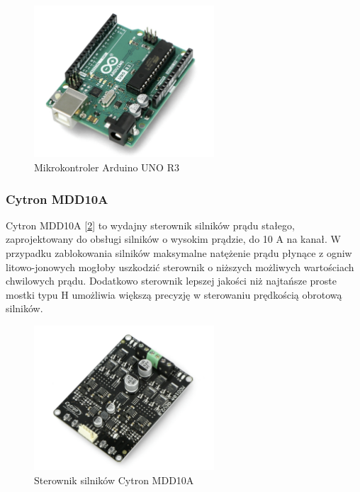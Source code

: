 \begin{figure}[H]
        \centering
        \includegraphics[width=0.6\textwidth]{./graf/arduino-r3.png}
        \caption{Mikrokontroler Arduino UNO R3}
        \label{zdj:arduino-r3}
\end{figure}

\subsubsection*{Cytron MDD10A}
Cytron MDD10A [\ref{zdj:cytron}] to wydajny sterownik silników prądu stałego, zaprojektowany do obsługi silników o wysokim prądzie, do 10 A na kanał. W przypadku zablokowania silników maksymalne natężenie prądu płynące z ogniw litowo-jonowych mogłoby uszkodzić sterownik o niższych możliwych wartościach chwilowych prądu. Dodatkowo sterownik lepszej jakości niż najtańsze proste mostki typu H umożliwia większą precyzję w sterowaniu prędkością obrotową silników. 


\begin{figure}[H]
        \centering
        \includegraphics[width=0.6\textwidth]{./graf/cytron-mdd10a.png}
        \caption{Sterownik silników Cytron MDD10A}
        \label{zdj:cytron}
\end{figure}

